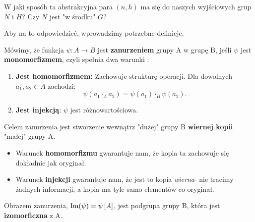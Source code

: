 \begin{question}
W jaki sposób ta abstrakcyjna para $(n,h)$ ma się do naszych wyjściowych grup $N$ i $H$? Czy $N$ jest "w środku" $G$?
\end{question}
Aby na to odpowiedzieć, wprowadzimy potrzebne definicje.
\begin{definition}
		
			Mówimy, że funkcja $\psi: A \rightarrow B$ jest \textbf{zanurzeniem} grupy A w grupę B, jeśli $\psi$ jest \textbf{monomorfizmem}, czyli spełnia dwa warunki			:
			\begin{enumerate}[label=\alph*)]
				\item \textbf{Jest homomorfizmem:} Zachowuje strukturę operacji. Dla dowolnych $a_1,a_2\in A$ zachodzi:
					\[
					\psi\left( a_1\cdot _{A}a_2 \right) = \psi\left( a_1 \right) \cdot _{B} \psi\left( a_2 \right) 
					.\] 
				\item \textbf{Jest injekcją}: $\psi$ jest różnowartościowa.
			\end{enumerate}
\end{definition}
\begin{intuition}

	Celem zanurzenia jest stworzenie wewnątrz "dużej" grupy B \textbf{wiernej kopii} "małej" grupy A.
	\begin{itemize}
		\item Warunek \textbf{homomorfizmu} gwarantuje nam, że kopia ta zachowuje się dokładnie jak oryginał.
		\item Warunek \textbf{injekcji} gwarantuje nam, że jest to kopia \textit{wierna}- nie tracimy żadnych informacji, a kopia ma tyle samo elementów co oryginał.
	\end{itemize}

	Obrazem zanurzenia, $\operatorname{Im}(\psi) = \psi \left[ A \right]$, jest podgrupa grupy B, która jest  \textbf{izomorficzna} z A.
\end{intuition}
